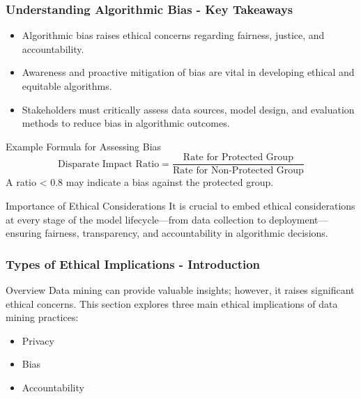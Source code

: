 \documentclass[aspectratio=169]{beamer}
\begin{document}
\begin{frame}[fragile]
    \frametitle{Understanding Algorithmic Bias - Key Takeaways}
    \begin{itemize}
        \item Algorithmic bias raises ethical concerns regarding fairness, justice, and accountability.
        \item Awareness and proactive mitigation of bias are vital in developing ethical and equitable algorithms.
        \item Stakeholders must critically assess data sources, model design, and evaluation methods to reduce bias in algorithmic outcomes.
    \end{itemize}

    \begin{block}{Example Formula for Assessing Bias}
        \begin{equation}
            \text{Disparate Impact Ratio} = \frac{\text{Rate for Protected Group}}{\text{Rate for Non-Protected Group}}
        \end{equation}
        A ratio < 0.8 may indicate a bias against the protected group.
    \end{block}
    
    \begin{block}{Importance of Ethical Considerations}
        It is crucial to embed ethical considerations at every stage of the model lifecycle—from data collection to deployment—ensuring fairness, transparency, and accountability in algorithmic decisions.
    \end{block}
\end{frame}

\begin{frame}[fragile]
    \frametitle{Types of Ethical Implications - Introduction}
    \begin{block}{Overview}
        Data mining can provide valuable insights; however, it raises significant ethical concerns. This section explores three main ethical implications of data mining practices: 
        \begin{itemize}
            \item Privacy
            \item Bias
            \item Accountability
        \end{itemize}
    \end{block}
\end{frame}
\end{document}
